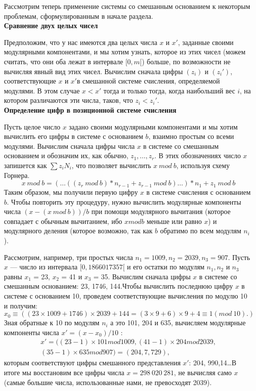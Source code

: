 \documentclass{mai_book}
\begin{document}
Рассмотрим теперь применение системы со смешанным основанием
к некоторым проблемам, сформулированным в начале раздела. \\
\textbf{Сравнение двух целых чисел} \par
 Предположим, что у нас имеются два целых числа $x$ и $x'$, 
заданные своими модулярными компонентами, и мы хотим узнать, которое
из этих чисел (можем считать, что они оба лежат в интервале $[0, m[$)
больше, по возможности не вычисляя явный вид этих чисел. Вычислим
сначала цифры $(z_{i})$ и $(z_{i}')$, соответствующие $x$ и $x'$в смешанной системе счисления, определяемой модулями. В этом случае $x < x'$ тогда и 
только тогда, когда наибольший вес $i$, на котором различаются эти числа,
таков, что $z_{i} < z_{i}'$. \\
\textbf{Определение цифр в позиционной системе счисления} \par
 Пусть целое число $x$ задано своими модулярными компонентами и
мы хотим вычислить его цифры в системе с основанием $b$, взаимно
простым со всеми модулями. Вычислим сначала цифры числа $x$ в 
системе со смешанным основанием и обозначим их, как обычно, $z_{1},\ldots,z_{r}$. В этих обозначениях число $x$ запишется как $\sum z_{i}N_{i}$, что позволяет вычислить $x\ mod\ b$, используя схему Горнера.
$$x\ mod\ b = (\ldots((z_{r}\ mod\ b)* n_{r-1} +z_{r-1}\ mod\ b)\ldots)*n_{1}+ z_{1}\ mod\ b $$
\pagebreak
\newpage
Таким образом, мы получили первую цифру $x$ в системе счисления с
основанием $b$. Чтобы повторить эту процедуру, нужно вычислить 
модулярные компоненты числа $(x - (x\ mod\ b))/b$ при помощи 
модулярного вычитания (которое совпадает с обычным вычитанием, ибо $x mod b$
меньше или равно $x$) и модулярного деления (которое возможно, так
как $b$ обратимо по всем модулям $n_{i}$).\par
Рассмотрим, например, три простых числа $n_{1} = 1009, n_{2} = 2039,
n_{3} = 907$. Пусть $x$ — число из интервала $[0, 1 866 017 357[$ и его остатки по модулям $n_{1}, n_{2}$ и $n_{3}$ равны $x_{1}$ = 23, $x_{2}$ = 41 и $x_{3}$ = 35. Вычислим сначала цифры $x$ в системе со смешанным основанием: 23, 1746, 144.Чтобы вычислить последнюю цифру $x$ в системе с основанием 10, 
проведем соответствующие вычисления по модулю 10 и получим:
$$x_{0}\equiv((23 \times 1009 + 1746) \times 2039 + 144 = (3 \times 9 + 6) \times 9 + 4 \equiv 1 (mod\ 10).)$$
Зная обратные к 10 по модулям $n_{i}$ а это 101, 204 и 635, вычисляем
модулярные компоненты числа $x' = (x - x_{0})/10$ :
\begin{equation*}
\begin{split}
x' = ((23 - 1) \times 101 mod 1009, (41 - 1) \times 204 mod 2039, \\
(35 - 1) \times 635 mod 907) = (204, 7, 729),
\end{split}
\end{equation*}
которым соответствуют цифры смешанного представления $x'$:
204, 990,14\ldots В итоге мы восстановим все цифры числа $x = 298\ 020\ 281$,
не вычисляя само $x$ (самые большие числа, использованные нами, не
превосходят 2039).\\
\sectiontop
\end{document}
